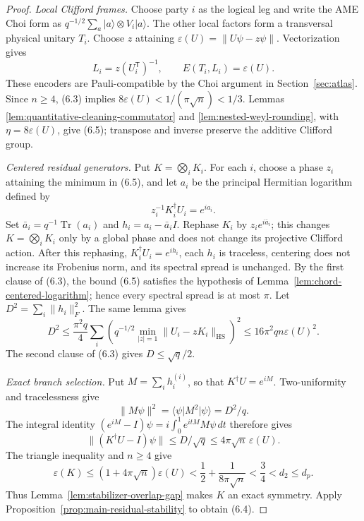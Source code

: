 \begin{proof}
\medskip\noindent\emph{Local Clifford frames.}
Choose party \(i\) as the logical leg and write the AME Choi form as
\(q^{-1/2}\sum_a|a\rangle\otimes V_i|a\rangle\).  The other local
factors form a transversal physical unitary \(T_i\).  Choose \(z\) attaining
\(\varepsilon(U)=\lVert U\psi-z\psi\rVert\).  Vectorization gives
\[
 L_i=z(U_i^{\mathsf T})^{-1},\qquad E(T_i,L_i)=\varepsilon(U).
\]
These encoders are Pauli-compatible by the Choi argument in
Section~\ref{sec:atlas}.  Since \(n\geq4\), (6.3) implies
\(8\varepsilon(U)<1/(\pi\sqrt n)<1/3\).  Lemmas
\ref{lem:quantitative-cleaning-commutator} and
\ref{lem:nested-weyl-rounding}, with \(\eta=8\varepsilon(U)\), give
(6.5); transpose and inverse preserve the additive Clifford group.

\medskip\noindent\emph{Centered residual generators.}
Put \(K=\bigotimes_iK_i\).  For each \(i\), choose a phase \(z_i\)
attaining the minimum in (6.5), and let \(a_i\) be the principal Hermitian
logarithm defined by
\[
 z_i^{-1}K_i^\dagger U_i=e^{ia_i}.
\]
Set \(\bar a_i=q^{-1}\operatorname{Tr}(a_i)\) and \(h_i=a_i-\bar a_iI\).
Rephase \(K_i\) by \(z_ie^{i\bar a_i}\); this changes
\(K=\bigotimes_iK_i\) only by a global phase and does not change its
projective Clifford action.  After this rephasing,
\(K_i^\dagger U_i=e^{ih_i}\), each \(h_i\) is traceless, centering does not
increase its Frobenius norm, and its spectral spread is unchanged.  By the
first clause of (6.3), the bound (6.5) satisfies the hypothesis of
Lemma~\ref{lem:chord-centered-logarithm}; hence every spectral spread is at
most \(\pi\).  Let \(D^2=\sum_i\lVert h_i\rVert_F^2\).  The same lemma gives
\[
 D^2\leq\frac{\pi^2q}{4}\sum_i
  \left(q^{-1/2}\min_{|z|=1}
   \lVert U_i-zK_i\rVert_{\mathrm{HS}}\right)^2
 \leq16\pi^2qn\varepsilon(U)^2.                      \tag{6.6}
\]
The second clause of (6.3) gives \(D\leq\sqrt q/2\).

\medskip\noindent\emph{Exact branch selection.}
Put \(M=\sum_i h_i^{(i)}\), so that
\(K^\dagger U=e^{iM}\).  Two-uniformity and tracelessness give
\[
 \lVert M\psi\rVert^2=\langle\psi\rvert M^2\lvert\psi\rangle
 =D^2/q.
\]
The integral identity
\((e^{iM}-I)\psi=i\int_0^1e^{itM}M\psi\,dt\) therefore gives
\[
 \lVert(K^\dagger U-I)\psi\rVert\leq D/\sqrt q
 \leq4\pi\sqrt n\,\varepsilon(U).
\]
The triangle inequality and \(n\geq4\) give
\[
 \varepsilon(K)\leq(1+4\pi\sqrt n)\varepsilon(U)
 <\frac12+\frac1{8\pi\sqrt n}<\frac34<d_2\leq d_p.
\]
Thus Lemma~\ref{lem:stabilizer-overlap-gap} makes \(K\) an exact symmetry.
Apply Proposition~\ref{prop:main-residual-stability} to obtain (6.4).
\end{proof}

